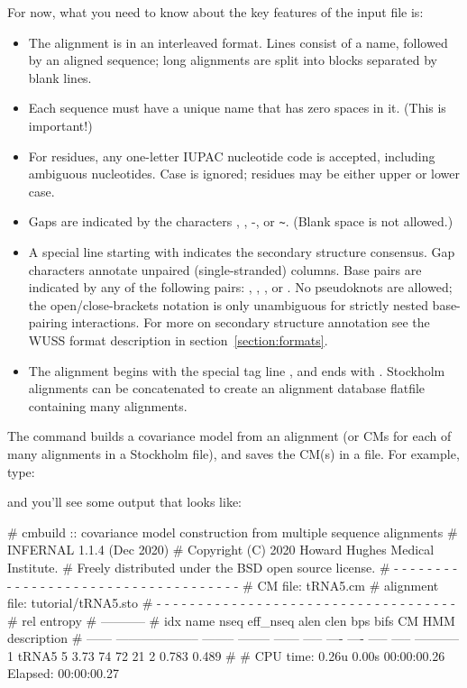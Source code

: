 For now, what you need to know about the key features of the input file is:
\begin{itemize}
\item The alignment is in an interleaved format.
Lines consist of a name, followed by an aligned sequence;
long alignments are split into blocks separated by blank lines.
\item Each sequence must have a unique name that has zero spaces in it. (This is important!)
\item For residues, any one-letter IUPAC nucleotide code is accepted,
      including ambiguous nucleotides. Case is ignored; residues
      may be either upper or lower case.
\item Gaps are indicated by the characters , \otext{\_}, -, or \verb+~+.
      (Blank space is not allowed.)
\item A special line starting with  indicates
      the secondary structure consensus. Gap characters annotate
      unpaired (single-stranded) columns. Base pairs are indicated
      by any of the following pairs: \otext{<>}, \otext{()}, \otext{[]},
      or \otext{\{\}}. No pseudoknots are allowed; the
      open/close-brackets notation is only unambiguous for strictly
      nested base-pairing interactions.
      For more on secondary structure annotation see the WUSS format
      description in section~\ref{section:formats}.
\item The alignment begins with the special tag line
      , and ends with \otext{//}.
      Stockholm alignments
      can be concatenated to create an alignment database flatfile
      containing many alignments.
\end{itemize}

The  command builds a covariance model from an alignment (or
CMs for each of many alignments in a Stockholm file), and saves the
CM(s) in a file. For example, type:


and you'll see some output that looks like:

\begin{sreoutput}
# cmbuild :: covariance model construction from multiple sequence alignments
# INFERNAL 1.1.4 (Dec 2020)
# Copyright (C) 2020 Howard Hughes Medical Institute.
# Freely distributed under the BSD open source license.
# - - - - - - - - - - - - - - - - - - - - - - - - - - - - - - - - - - - -
# CM file:                                            tRNA5.cm
# alignment file:                                     tutorial/tRNA5.sto
# - - - - - - - - - - - - - - - - - - - - - - - - - - - - - - - - - - - -
#                                                                      rel entropy
#                                                                      -----------
# idx    name                     nseq eff_nseq   alen  clen  bps bifs    CM   HMM description
# ------ -------------------- -------- -------- ------ ----- ---- ---- ----- ----- -----------
       1 tRNA5                       5     3.73     74    72   21    2 0.783 0.489 
#
# CPU time: 0.26u 0.00s 00:00:00.26 Elapsed: 00:00:00.27
\end{sreoutput}

